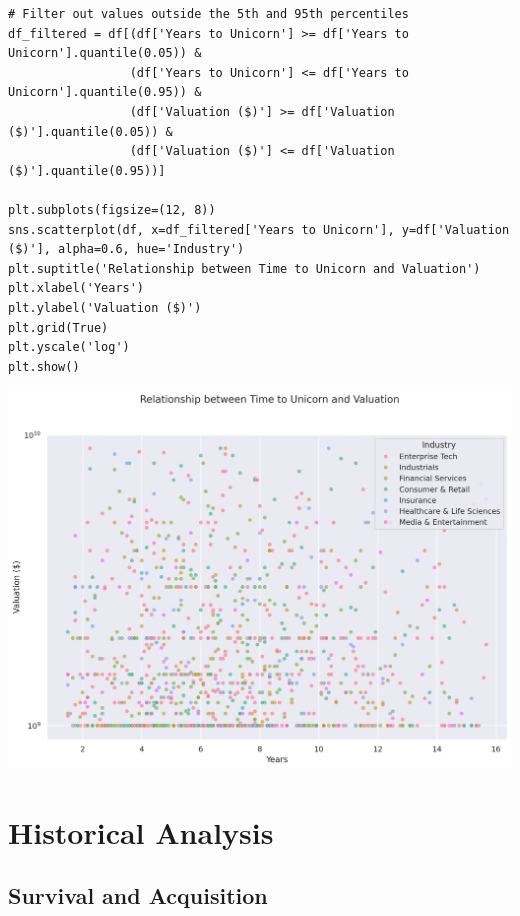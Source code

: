 \documentclass[a4paper,12pt]{article}
\begin{document}
\begin{verbatim}
# Filter out values outside the 5th and 95th percentiles
df_filtered = df[(df['Years to Unicorn'] >= df['Years to Unicorn'].quantile(0.05)) &
                 (df['Years to Unicorn'] <= df['Years to Unicorn'].quantile(0.95)) &
                 (df['Valuation ($)'] >= df['Valuation ($)'].quantile(0.05)) &
                 (df['Valuation ($)'] <= df['Valuation ($)'].quantile(0.95))]

plt.subplots(figsize=(12, 8))
sns.scatterplot(df, x=df_filtered['Years to Unicorn'], y=df['Valuation ($)'], alpha=0.6, hue='Industry')
plt.suptitle('Relationship between Time to Unicorn and Valuation')
plt.xlabel('Years')
plt.ylabel('Valuation ($)')
plt.grid(True)
plt.yscale('log')
plt.show()
\end{verbatim}

\begin{center}
\includegraphics[width=.9\linewidth]{./.ob-jupyter/ab345d53297c74faf9b4e92ff3afa494318d36dc.png}
\label{}
\end{center}
\section{Historical Analysis}
\label{sec:org0fe5c38}
\subsection{Survival and Acquisition}
\label{sec:org306ebeb}
\end{document}
